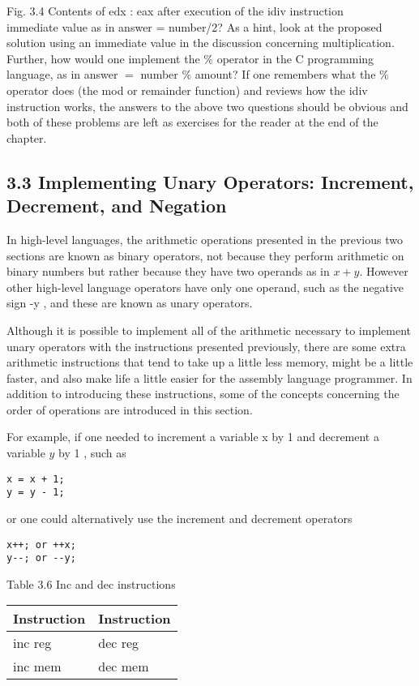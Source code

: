 \documentclass[10pt]{article}
\begin{document}
Fig. 3.4 Contents of edx : eax after execution of the idiv instruction\\
immediate value as in answer = number/2? As a hint, look at the proposed solution using an immediate value in the discussion concerning multiplication. Further, how would one implement the \% operator in the C programming language, as in answer $=$ number $\%$ amount? If one remembers what the $\%$ operator does (the mod or remainder function) and reviews how the idiv instruction works, the answers to the above two questions should be obvious and both of these problems are left as exercises for the reader at the end of the chapter.

\subsection*{3.3 Implementing Unary Operators: Increment, Decrement, and Negation}
In high-level languages, the arithmetic operations presented in the previous two sections are known as binary operators, not because they perform arithmetic on binary numbers but rather because they have two operands as in $x+y$. However other high-level language operators have only one operand, such as the negative sign -y , and these are known as unary operators.

Although it is possible to implement all of the arithmetic necessary to implement unary operators with the instructions presented previously, there are some extra arithmetic instructions that tend to take up a little less memory, might be a little faster, and also make life a little easier for the assembly language programmer. In addition to introducing these instructions, some of the concepts concerning the order of operations are introduced in this section.

For example, if one needed to increment a variable x by 1 and decrement a variable $y$ by 1 , such as

\begin{verbatim}
x = x + 1;
y = y - 1;
\end{verbatim}

or one could alternatively use the increment and decrement operators

\begin{verbatim}
x++; or ++x;
y--; or --y;
\end{verbatim}

Table 3.6 Inc and dec instructions

\begin{center}
\begin{tabular}{|l|l|}
\hline
Instruction & Instruction \\
\hline
inc reg & dec reg \\
\hline
inc mem & dec mem \\
\hline
\end{tabular}
\end{center}
\end{document}
